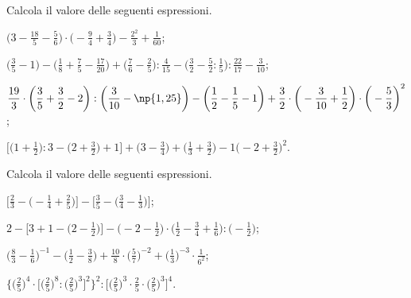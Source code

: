 \begin{esercizio}[\Ast]
 Calcola il valore delle seguenti espressioni.
\begin{enumeratea}
\spazielenx
\item $\displaystyle{\bigg(3-\frac{18}{5}-\frac{5}{6}\bigg)\cdot%
\bigg(-{\frac{9}{4}}+\frac{3}{4}\bigg)-\frac{2^{2}}{3}+\frac{1}{60}}$;
\item $\displaystyle{\bigg(\frac{3}{5}-1\bigg)-\bigg(\frac{1}{8}+\frac{7}{5}-\frac{17}{20}\bigg)+%
\bigg(\frac{7}{6}-\frac{2}{5}\bigg):\frac{4}{15}-\bigg(\frac{3}{2}-\frac{5}{2}:\frac{1}{5}\bigg):\frac{22}{17}-%
\frac{3}{10}}$;
\item $\displaystyle{\frac{19}{3}\cdot\bigg(\frac{3}{5}+\frac{3}{2}-2\bigg):\bigg(\frac{3}{10}-\np{1,25}\bigg)-%
\bigg(\frac{1}{2}-\frac{1}{5}-1\bigg)+\frac{3}{2}\cdot\bigg(-{\frac{3}{10}}+\frac{1}{2}\bigg)\cdot%
\bigg(-{\frac{5}{3}}\bigg)^{2}}$;
\item $\displaystyle{\bigg[\bigg(1+\frac{1}{2}\bigg):3-\bigg(2+\frac{3}{2}\bigg)+1\bigg]+\bigg(3-\frac{3}{4}\bigg)%
+\bigg(\frac{1}{3}+\frac{3}{2}\bigg)-1\bigg(-2+\frac{3}{2}\bigg)^{2}}$.
\end{enumeratea}
\end{esercizio}

\begin{esercizio}[\Ast]
 Calcola il valore delle seguenti espressioni.
\begin{enumeratea}
\spazielenx
\item $\displaystyle{\bigg[\frac{2}{3}-\bigg(-\frac{1}{4}+\frac{2}{5}\bigg)\bigg]-\bigg[\frac{3}{5}-%
\bigg(\frac{3}{4}-\frac{1}{3}\bigg)\bigg]}$;
\item $\displaystyle{2-\bigg[3+1-\bigg(2-\frac{1}{2}\bigg)\bigg]-\bigg(-2-\frac{1}{2}\bigg)\cdot%
\bigg(\frac{1}{2}-\frac{3}{4}+\frac{1}{6}\bigg):\bigg(-{\frac{1}{2}}\bigg)}$;
\item $\displaystyle{\bigg(\frac{8}{3}-\frac{1}{6}\bigg)^{-1}-\bigg(\frac{1}{2}-\frac{3}{8}\bigg)+\frac{10}{8}\cdot%
\bigg(\frac{5}{7}\bigg)^{-2}+\bigg(\frac{1}{3}\bigg)^{-3}\cdot\frac{1}{6^{2}}}$;
\item $\displaystyle{\bigg\{\bigg(\frac{2}{5}\bigg)^{4}\cdot\bigg[\bigg(\frac{2}{5}\bigg)^{8}:%
\bigg(\frac{2}{5}\bigg)^{3}\bigg]^{2}\bigg\}^{2}:\bigg[\bigg(\frac{2}{5}\bigg)^{3}\cdot{\frac{2}{5}}\cdot%
\bigg(\frac{2}{5}\bigg)^{3}\bigg]^{4}}$.
\end{enumeratea}
\end{esercizio}

